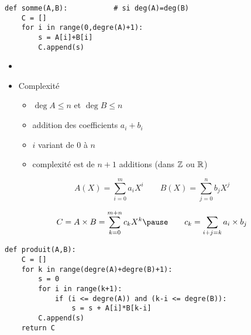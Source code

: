 \begin{frame}[fragile]

\begin{algo}[polynome.py (1)]
\begin{lstlisting}
def somme(A,B):           # si deg(A)=deg(B)
    C = []
    for i in range(0,degre(A)+1): 
        s = A[i]+B[i]
        C.append(s) 
\end{lstlisting}  
\end{algo}

\pause
\bigskip

\begin{itemize}
  \item {}
\pause
  \item Complexité 
\pause
  \begin{itemize}
    \item $\deg A \le n$ et $\deg B \le n$ 
\pause
    \item addition des coefficients $a_i+b_i$
\pause
    \item $i$ variant de $0$ à $n$
\pause
    \item complexité est de $n+1$ additions (dans $\mathbb{Z}$ ou $\mathbb{R}$)
  \end{itemize}
\end{itemize}

\end{frame}


\begin{frame}[fragile]

$$A(X) = \sum_{i=0}^m a_i X^i \qquad B(X) = \sum_{j=0}^n b_j X^j$$

\pause

$$C = A \times B = \sum_{k=0}^{m+n} c_k X^k  \pause \qquad c_k = \sum_{i+j=k} a_i \times b_j$$
\pause
\begin{algo}[polynome.py (2)]
\begin{lstlisting}
def produit(A,B):
    C = []
    for k in range(degre(A)+degre(B)+1): 
        s = 0
        for i in range(k+1):            
            if (i <= degre(A)) and (k-i <= degre(B)):
                s = s + A[i]*B[k-i]
        C.append(s)
    return C
\end{lstlisting}  
\end{algo} 
\end{frame}

